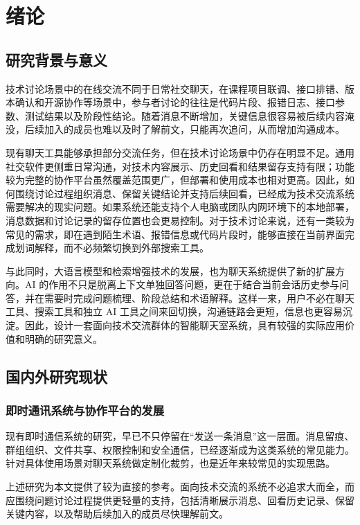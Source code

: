 \chapter{绪论}

\section{研究背景与意义}

技术讨论场景中的在线交流不同于日常社交聊天，在课程项目联调、接口排错、版本确认和开源协作等场景中，参与者讨论的往往是代码片段、报错日志、接口参数、测试结果以及阶段性结论。随着消息不断增加，关键信息很容易被后续内容淹没，后续加入的成员也难以及时了解前文，只能再次追问，从而增加沟通成本。

现有聊天工具能够承担部分交流任务，但在技术讨论场景中仍存在明显不足。通用社交软件更侧重日常沟通，对技术内容展示、历史回看和结果留存支持有限；功能较为完整的协作平台虽然覆盖范围更广，但部署和使用成本也相对更高。因此，如何围绕讨论过程组织消息、保留关键结论并支持后续回看，已经成为技术交流系统需要解决的现实问题\cite{textchat2024}。如果系统还能支持个人电脑或团队内网环境下的本地部署，消息数据和讨论记录的留存位置也会更易控制。对于技术讨论来说，还有一类较为常见的需求，即在遇到陌生术语、报错信息或代码片段时，能够直接在当前界面完成划词解释，而不必频繁切换到外部搜索工具。

与此同时，大语言模型和检索增强技术的发展，也为聊天系统提供了新的扩展方向。AI 的作用不只是脱离上下文单独回答问题，更在于结合当前会话历史参与问答，并在需要时完成问题梳理、阶段总结和术语解释\cite{qaoverview2025}。这样一来，用户不必在聊天工具、搜索工具和独立 AI 工具之间来回切换，沟通链路会更短，信息也更容易沉淀。因此，设计一套面向技术交流群体的智能聊天室系统，具有较强的实际应用价值和明确的研究意义。

\section{国内外研究现状}

\subsection{即时通讯系统与协作平台的发展}

现有即时通信系统的研究，早已不只停留在“发送一条消息”这一层面。消息留痕、群组组织、文件共享、权限控制和安全通信，已经逐渐成为这类系统的常见能力。针对具体使用场景对聊天系统做定制化裁剪，也是近年来较常见的实现思路。

上述研究为本文提供了较为直接的参考。面向技术交流的系统不必追求大而全，而应围绕问题讨论过程提供更轻量的支持，包括清晰展示消息、回看历史记录、保留关键内容，以及帮助后续加入的成员尽快理解前文。

